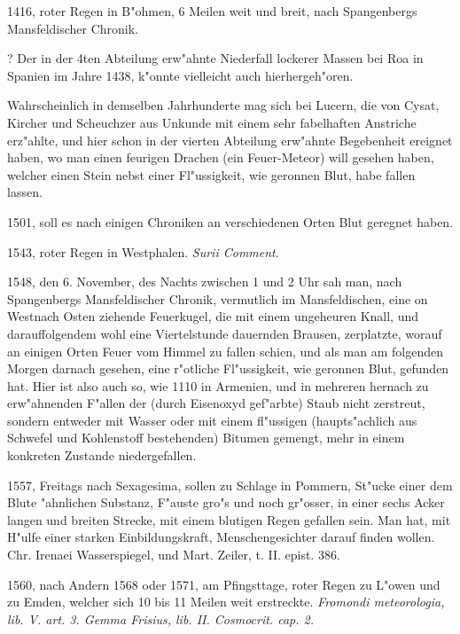 \documentclass[a4paper, 11pt, oneside, polutonikogreek, german]{article}
\begin{document}
1416, roter Regen in B"ohmen, 6 Meilen weit und breit, nach Spangenbergs Mansfeldischer Chronik.

? Der in der 4ten Abteilung erw"ahnte Niederfall lockerer Massen bei Roa in Spanien im Jahre 1438, k"onnte vielleicht auch hierhergeh"oren.

Wahrscheinlich in demselben Jahrhunderte mag sich bei Lucern, die von Cysat, Kircher und Scheuchzer aus Unkunde mit einem sehr fabelhaften Anstriche erz"ahlte, und hier schon in der vierten Abteilung erw"ahnte Begebenheit ereignet haben, wo man einen feurigen Drachen (ein Feuer-Meteor) will gesehen haben, welcher einen Stein nebst einer Fl"ussigkeit, wie geronnen Blut, habe fallen lassen.

1501, soll es nach einigen Chroniken an verschiedenen Orten Blut geregnet haben.

1543, roter Regen in Westphalen. \emph{Surii Comment}.

1548, den 6. November, des Nachts zwischen 1 und 2 Uhr sah man, nach Spangenbergs Mansfeldischer Chronik, vermutlich im Mansfeldischen, eine on Westnach Osten ziehende Feuerkugel, die mit einem ungeheuren Knall, und darauffolgendem wohl eine Viertelstunde dauernden Brausen, zerplatzte, worauf an einigen Orten Feuer vom Himmel zu fallen schien, und als man am folgenden Morgen darnach gesehen, eine r"otliche Fl"ussigkeit, wie geronnen Blut, gefunden hat. Hier ist also auch so, wie 1110 in Armenien, und in mehreren hernach zu erw"ahnenden F"allen der (durch Eisenoxyd gef"arbte) Staub nicht zerstreut, sondern entweder mit Wasser oder mit einem fl"ussigen (haupts"achlich aus Schwefel und Kohlenstoff bestehenden) Bitumen gemengt, mehr in einem konkreten Zustande niedergefallen.

1557, Freitags nach Sexagesima, sollen zu Schlage in Pommern, St"ucke einer dem Blute "ahnlichen Substanz, F"auste gro"s und noch gr"osser, in einer sechs Acker langen und breiten Strecke, mit einem blutigen Regen gefallen sein. Man hat, mit H"ulfe einer starken Einbildungskraft, Menschengesichter darauf finden wollen. Chr. Irenaei Wasserspiegel, und Mart. Zeiler, t. II. epist. 386.

1560, nach Andern 1568 oder 1571, am Pfingsttage, roter Regen zu L"owen und zu Emden, welcher sich 10 bis 11 Meilen weit erstreckte. \emph{Fromondi meteorologia, lib. V. art. 3. Gemma Frisius, lib. II. Cosmocrit. cap. 2.}
\end{document}
